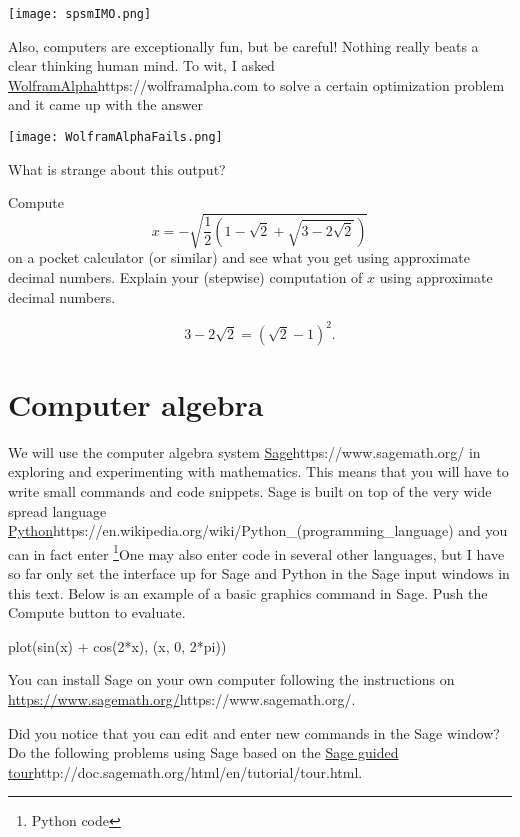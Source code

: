 \documentclass{article}
\begin{document}
\begin{frameit}
\texttt{[image: spsmIMO.png]}

Also, computers are exceptionally fun, but be careful! Nothing
really beats a clear thinking human mind. To wit, I asked \url{WolframAlpha}{https://wolframalpha.com} to solve a
certain optimization problem and it came up with the answer

\texttt{[image: WolframAlphaFails.png]}

\beginshex
What is strange about this output?

\begin{hint}[showhide]
  Compute
  $$
  x = -\sqrt{\frac{1}{2} \left(1 - \sqrt{2} + \sqrt{3 - 2\sqrt{2}}\right)}
  $$
  on a pocket calculator (or similar) and see what you get using approximate decimal numbers.
  Explain your (stepwise) computation of $x$ using approximate decimal numbers.
  
  \begin{hint}[showhide]
  $$
  3 - 2 \sqrt{2} = (\sqrt{2} - 1)^2.
  $$
\end{hint}
\end{hint}
\endshex

\end{frameit}




\section{Computer algebra}

We will use the computer algebra system
\url{Sage}{https://www.sagemath.org/} in exploring and experimenting
with mathematics. This means that you will have to write small
commands and code snippets. Sage is built on top of the very wide
spread language
\url{Python}{https://en.wikipedia.org/wiki/Python_(programming_language)}
and you can in fact enter \footnote{Python code}{One may also enter code in several other languages, but I have so far only set the interface up for Sage and Python} in
the Sage input windows in this text. Below is an example of a basic
graphics command in Sage.  Push the Compute button to evaluate.


\begin{sage}
plot(sin(x) + cos(2*x), (x, 0, 2*pi))
\end{sage}

You can install Sage on your own computer following the instructions on
\url{https://www.sagemath.org/}{https://www.sagemath.org/}.

\beginshex
Did you notice that you can edit and enter new commands in the Sage window?
Do the following problems using Sage based on the \url{Sage guided tour}{http://doc.sagemath.org/html/en/tutorial/tour.html}. 
\end{document}
